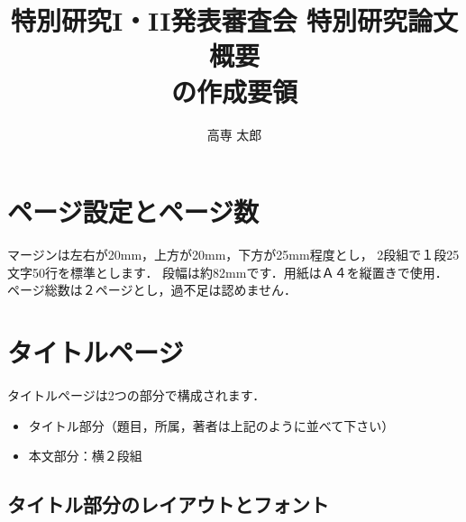 \documentclass[a4j,10pt]{jsarticle}
\title{特別研究I・II発表審査会 特別研究論文概要\\の作成要領}
\author{高専 太郎}
\affiliation{創造工学専攻}
\begin{document}
\maketitle%



\thispagestyle{empty}
\pagestyle{empty}

\section{ページ設定とページ数}

マージンは左右が20mm，上方が20mm，下方が25mm程度とし，
2段組で１段25文字50行を標準とします．
段幅は約82mmです．用紙はＡ４を縦置きで使用．
ページ総数は２ページとし，過不足は認めません．

\section{タイトルページ}

タイトルページは2つの部分で構成されます．
\begin{itemize}
\item タイトル部分（題目，所属，著者は上記のように並べて下さい）
\item 本文部分：横２段組
\end{itemize}

\subsection{タイトル部分のレイアウトとフォント}
\end{document}
